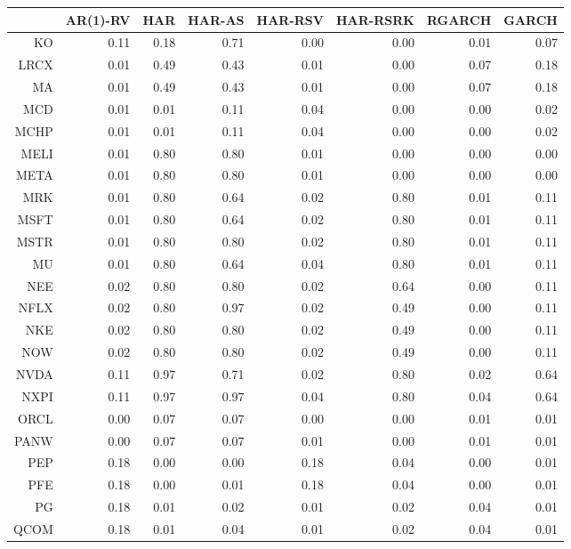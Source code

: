 \begin{table}[ht]
\centering
\begin{tabular}{rrrrrrrr}
  \hline
 & AR(1)-RV & HAR & HAR-AS & HAR-RSV & HAR-RSRK & RGARCH & GARCH \\ 
  \hline
KO & 0.11 & 0.18 & 0.71 & 0.00 & 0.00 & 0.01 & 0.07 \\ 
  LRCX & 0.01 & 0.49 & 0.43 & 0.01 & 0.00 & 0.07 & 0.18 \\ 
  MA & 0.01 & 0.49 & 0.43 & 0.01 & 0.00 & 0.07 & 0.18 \\ 
  MCD & 0.01 & 0.01 & 0.11 & 0.04 & 0.00 & 0.00 & 0.02 \\ 
  MCHP & 0.01 & 0.01 & 0.11 & 0.04 & 0.00 & 0.00 & 0.02 \\ 
  MELI & 0.01 & 0.80 & 0.80 & 0.01 & 0.00 & 0.00 & 0.00 \\ 
  META & 0.01 & 0.80 & 0.80 & 0.01 & 0.00 & 0.00 & 0.00 \\ 
  MRK & 0.01 & 0.80 & 0.64 & 0.02 & 0.80 & 0.01 & 0.11 \\ 
  MSFT & 0.01 & 0.80 & 0.64 & 0.02 & 0.80 & 0.01 & 0.11 \\ 
  MSTR & 0.01 & 0.80 & 0.80 & 0.02 & 0.80 & 0.01 & 0.11 \\ 
  MU & 0.01 & 0.80 & 0.64 & 0.04 & 0.80 & 0.01 & 0.11 \\ 
  NEE & 0.02 & 0.80 & 0.80 & 0.02 & 0.64 & 0.00 & 0.11 \\ 
  NFLX & 0.02 & 0.80 & 0.97 & 0.02 & 0.49 & 0.00 & 0.11 \\ 
  NKE & 0.02 & 0.80 & 0.80 & 0.02 & 0.49 & 0.00 & 0.11 \\ 
  NOW & 0.02 & 0.80 & 0.80 & 0.02 & 0.49 & 0.00 & 0.11 \\ 
  NVDA & 0.11 & 0.97 & 0.71 & 0.02 & 0.80 & 0.02 & 0.64 \\ 
  NXPI & 0.11 & 0.97 & 0.97 & 0.04 & 0.80 & 0.04 & 0.64 \\ 
  ORCL & 0.00 & 0.07 & 0.07 & 0.00 & 0.00 & 0.01 & 0.01 \\ 
  PANW & 0.00 & 0.07 & 0.07 & 0.01 & 0.00 & 0.01 & 0.01 \\ 
  PEP & 0.18 & 0.00 & 0.00 & 0.18 & 0.04 & 0.00 & 0.01 \\ 
  PFE & 0.18 & 0.00 & 0.01 & 0.18 & 0.04 & 0.00 & 0.01 \\ 
  PG & 0.18 & 0.01 & 0.02 & 0.01 & 0.02 & 0.04 & 0.01 \\ 
  QCOM & 0.18 & 0.01 & 0.04 & 0.01 & 0.02 & 0.04 & 0.01 \\ 

\end{tabular}
\end{table}
